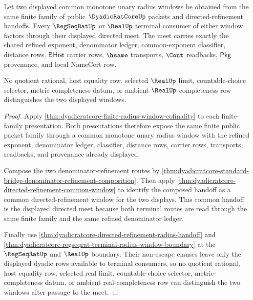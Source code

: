 \begin{theorem}
\label{thm:dyadicratcore-finite-radius-window-directed-meet}
Let two displayed common monotone unary radius windows be obtained from the
same finite family of public $\DyadicRatCoreUp$ packets and
directed-refinement handoffs. Every $\RegSeqRatUp$ or $\RealUp$ terminal
consumer of either window factors through their displayed directed meet. The
meet carries exactly the shared refined exponent, denominator ledger,
common-exponent classifier, distance rows, $\mathsf{BHist}$ carrier rows,
$\hsame$ transports, $\Cont$ readbacks, $\mathsf{Pkg}$ provenance, and local
NameCert row.

No quotient rational, host equality row, selected $\RealUp$ limit,
countable-choice selector, metric-completeness datum, or ambient $\RealUp$
completeness row distinguishes the two displayed windows.
\end{theorem}
\begin{proof}
Apply \autoref{thm:dyadicratcore-finite-radius-window-cofinality} to each
finite-family presentation. Both presentations therefore expose the same
finite public packet family through a common monotone unary radius window with
the refined exponent, denominator ledger, classifier, distance rows, carrier
rows, transports, readbacks, and provenance already displayed.

Compose the two denominator-refinement routes by
\autoref{thm:dyadicratcore-standard-bridge-denominator-refinement-composition}.
Then apply \autoref{thm:dyadicratcore-directed-refinement-common-window} to
identify the composed handoff as a common directed-refinement window for the
two displays. This common handoff is the displayed directed meet because both
terminal routes are read through the same finite family and the same refined
denominator ledger.

Finally use
\autoref{thm:dyadicratcore-directed-refinement-radius-handoff} and
\autoref{thm:dyadicratcore-regseqrat-terminal-radius-window-boundary} at the
$\RegSeqRatUp$ and $\RealUp$ boundary. Their non-escape clauses leave only the
displayed dyadic rows available to terminal consumers, so no quotient rational,
host equality row, selected real limit, countable-choice selector,
metric-completeness datum, or ambient real-completeness row can distinguish the
two windows after passage to the meet.
\end{proof}

